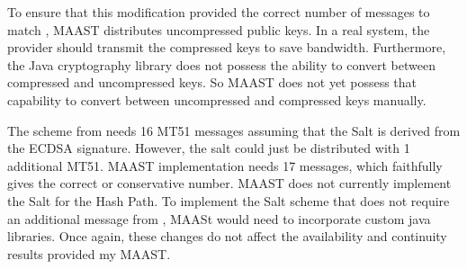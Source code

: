\documentclass[letterpaper,times]{IONconf/IONconf}
\begin{document}
	To ensure that this modification provided the correct number of messages to match \cite{Anderson2021}, MAAST distributes uncompressed public keys.
	In a real system, the provider should transmit the compressed keys to save bandwidth.
	Furthermore, the Java cryptography library does not possess the ability to convert between compressed and uncompressed keys.
	So MAAST does not yet possess that capability to convert between uncompressed and compressed keys manually.

	The scheme from \cite{Anderson2021} needs 16 MT51 messages assuming that the Salt is derived from the ECDSA signature.
	However, the salt could just be distributed with 1 additional MT51.
	MAAST implementation needs 17 messages, which faithfully gives the correct or conservative number.
	MAAST does not currently implement the Salt for the Hash Path.
	To implement the Salt scheme that does not require an additional message from \cite{Anderson2021}, MAASt would need to incorporate custom java libraries.
	Once again, these changes do not affect the availability and continuity results provided my MAAST.



\end{document}
